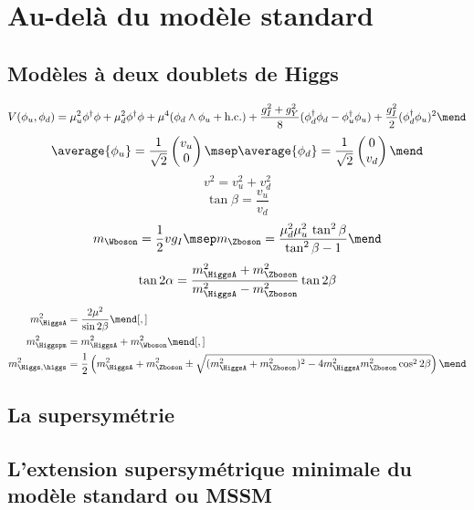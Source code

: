 \section{Au-delà du modèle standard}\label{chapter-MS-MSSM-section-BSM}
\subsection{Modèles à deux doublets de Higgs}\label{chapter-MS-MSSM-section-BSM-subsec-dbl_H_dbl}


\begin{equation}
V(\phi_u,\phi_d)
=
\mu_u^2\phi^\dagger\phi
+
\mu_d^2\phi^\dagger\phi
+
\mu^4 (\phi_d\wedge\phi_u+\text{h.c.})
+
\frac{g_I^2+g_Y^2}{8} (\phi_d^\dagger\phi_d-\phi_u^\dagger\phi_u)
+
\frac{g_I^2}{2} (\phi_d^\dagger\phi_u)^2
\mend
\end{equation}
\begin{equation}
\average{\phi_u} = \frac{1}{\sqrt{2}} \begin{pmatrix}v_u \\ 0 \end{pmatrix}
\msep
\average{\phi_d} = \frac{1}{\sqrt{2}} \begin{pmatrix} 0\\ v_d \end{pmatrix}
\mend
\end{equation}
\begin{equation}
v^2 = v_u^2 + v_d^2
\end{equation}
\begin{equation}
\tan\beta = \frac{v_u}{v_d}
\end{equation}
\begin{equation}
m_{\Wboson} = \frac{1}{2} v g_I
\msep
m_{\Zboson} = \frac{\mu_d^2\mu_u^2 \, \tan^2\beta}{\tan^2\beta-1}
\mend
\end{equation}
\begin{equation}
\tan 2\alpha = \frac{m_{\HiggsA}^2+m_{\Zboson}^2}{m_{\HiggsA}^2-m_{\Zboson}^2} \tan 2\beta
\end{equation}
\begin{align}
m_{\HiggsA}^2 &= \frac{2\mu^2}{\sin 2\beta}
\mend[,]\\
m_{\Higgspm}^2 &= m_{\HiggsA}^2+m_{\Wboson}^2
\mend[,]\\
m_{\Higgs,\higgs}^2 &= \frac{1}{2} \left( m_{\HiggsA}^2+m_{\Zboson}^2 \pm \sqrt{(m_{\HiggsA}^2+m_{\Zboson}^2)^2-4m_{\HiggsA}^2m_{\Zboson}^2\cos^2 2\beta} \right)
\mend
\end{align}
\subsection{La supersymétrie}\label{chapter-MS-MSSM-section-BSM-subsec-SUSY}
\subsection{L'extension supersymétrique minimale du modèle standard ou MSSM}\label{chapter-MS-MSSM-section-BSM-subsec-MSSM}
